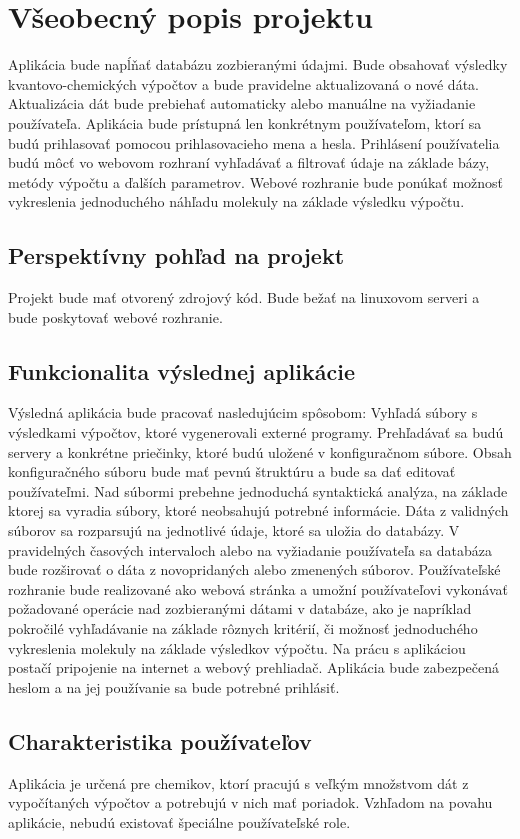 \documentclass[12pt,a4paper, draft]{article}
\begin{document}
\section{Všeobecný popis projektu}
Aplikácia bude napĺňať databázu zozbieranými údajmi. Bude obsahovať výsledky kvantovo-chemických výpočtov a bude pravidelne aktualizovaná o nové dáta. Aktualizácia dát bude prebiehať automaticky alebo manuálne na vyžiadanie používateľa. Aplikácia bude prístupná len konkrétnym používateľom, ktorí sa budú prihlasovať pomocou prihlasovacieho mena a hesla. Prihlásení používatelia budú môcť vo webovom rozhraní vyhľadávať a filtrovať údaje na základe bázy, metódy výpočtu a ďalších parametrov. Webové rozhranie bude ponúkať možnosť vykreslenia jednoduchého náhľadu molekuly na základe výsledku výpočtu.

\subsection{Perspektívny pohľad na projekt}
Projekt bude mať otvorený zdrojový kód. Bude bežať na linuxovom serveri a bude poskytovať webové rozhranie.

\subsection{Funkcionalita výslednej aplikácie}
Výsledná aplikácia bude pracovať nasledujúcim spôsobom: 
Vyhľadá sú\-bory s výsledkami výpočtov, ktoré vygenerovali externé programy. Prehľadávať sa budú servery a konkrétne priečinky, ktoré budú uložené v konfiguračnom súbore. Obsah konfiguračného súboru bude mať pevnú štruktúru a bude sa dať editovať používateľmi. Nad súbormi prebehne jednoduchá syntaktická analýza, na základe ktorej sa vyradia súbory, ktoré neobsahujú potrebné informácie. Dáta z validných súborov sa rozparsujú na jednotlivé údaje, ktoré sa uložia do databázy.
V pravidelných časových intervaloch alebo na vyžiadanie používateľa sa databáza bude rozširovať o dáta z novopridaných alebo zmenených súborov. Používateľské rozhranie bude realizované ako webová stránka a umožní používateľovi vykonávať požadované operácie nad zozbieranými dátami v databáze, ako je napríklad pokročilé vyhľadávanie na základe rôznych kritérií, či možnosť jednoduchého vykreslenia molekuly na základe výsledkov výpočtu. Na prácu s aplikáciou postačí pripojenie na internet a webový prehliadač. Aplikácia bude zabezpečená heslom a na jej používanie sa bude potrebné prihlásiť.

\subsection{Charakteristika používateľov}
Aplikácia je určená pre chemikov, ktorí pracujú s veľkým množstvom dát z vypočítaných výpočtov a potrebujú v nich mať poriadok. Vzhľadom na povahu aplikácie, nebudú existovať špeciálne používateľské role.
\end{document}
